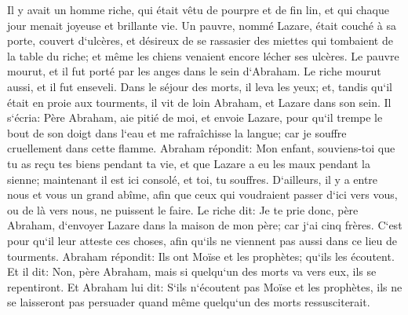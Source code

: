 \verse Il y avait un homme riche, qui était vêtu de pourpre et de fin lin, et qui chaque jour menait joyeuse et brillante vie. 
\verse Un pauvre, nommé Lazare, était couché à sa porte, couvert d`ulcères, 
\verse et désireux de se rassasier des miettes qui tombaient de la table du riche; et même les chiens venaient encore lécher ses ulcères. 
\verse Le pauvre mourut, et il fut porté par les anges dans le sein d`Abraham. Le riche mourut aussi, et il fut enseveli. 
\verse Dans le séjour des morts, il leva les yeux; et, tandis qu`il était en proie aux tourments, il vit de loin Abraham, et Lazare dans son sein. 
\verse Il s`écria: Père Abraham, aie pitié de moi, et envoie Lazare, pour qu`il trempe le bout de son doigt dans l`eau et me rafraîchisse la langue; car je souffre cruellement dans cette flamme. 
\verse Abraham répondit: Mon enfant, souviens-toi que tu as reçu tes biens pendant ta vie, et que Lazare a eu les maux pendant la sienne; maintenant il est ici consolé, et toi, tu souffres. 
\verse D`ailleurs, il y a entre nous et vous un grand abîme, afin que ceux qui voudraient passer d`ici vers vous, ou de là vers nous, ne puissent le faire. 
\verse Le riche dit: Je te prie donc, père Abraham, d`envoyer Lazare dans la maison de mon père; car j`ai cinq frères. 
\verse C`est pour qu`il leur atteste ces choses, afin qu`ils ne viennent pas aussi dans ce lieu de tourments. 
\verse Abraham répondit: Ils ont Moïse et les prophètes; qu`ils les écoutent. 
\verse Et il dit: Non, père Abraham, mais si quelqu`un des morts va vers eux, ils se repentiront. 
\verse Et Abraham lui dit: S`ils n`écoutent pas Moïse et les prophètes, ils ne se laisseront pas persuader quand même quelqu`un des morts ressusciterait. 

\chapter{}

